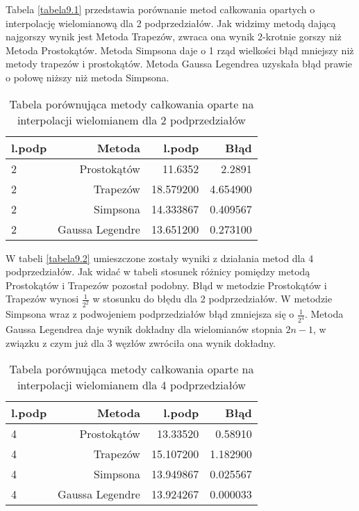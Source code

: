 \documentclass[12pt,twoside]{article}
\begin{document}
Tabela \eqref{tabela9.1} przedstawia porównanie metod całkowania opartych o interpolację wielomianową dla 2 podprzedziałów.
Jak widzimy metodą dającą najgorszy wynik jest Metoda Trapezów, zwraca ona wynik 2-krotnie gorszy niż Metoda Prostokątów. 
Metoda Simpsona daje o 1 rząd wielkości błąd mniejszy niż metody trapezów i prostokątów. 
Metoda Gaussa Legendrea uzyskała błąd prawie o połowę niższy niż metoda Simpsona.

\begin{table}
\centering 
\caption{Tabela porównująca metody całkowania oparte na interpolacji wielomianem dla 2 podprzedziałów }
\label{tabela9.1}
\begin{tabular}{lrrr}
\toprule
{l.podp} & Metoda &  l.podp &  Błąd \\
\midrule
2  &     Prostokątów & 11.6352 &   2.2891  \\
2  &     Trapezów & 18.579200 &  4.654900  \\
2  &     Simpsona & 14.333867 &   0.409567  \\
2  &     Gaussa Legendre & 13.651200 &  0.273100  \\
\bottomrule
\end{tabular}
\end{table}


W tabeli \eqref{tabela9.2} umieszczone zostały wyniki z działania metod dla 4 podprzedziałów.
Jak widać w tabeli stosunek różnicy pomiędzy metodą Prostokątów i Trapezów pozostał podobny.
Błąd w metodzie Prostokątów i Trapezów wynosi $\frac{1}{2^2}$ w stosunku do błędu dla 2 podprzedziałów.
W metodzie Simpsona wraz z podwojeniem podprzedziałów błąd zmniejsza się o $\frac{1}{2^4}$.
Metoda Gaussa Legendrea daje wynik dokładny dla wielomianów stopnia $2n-1$, w związku z czym już dla 3 węzłów zwróciła ona wynik dokładny.


\begin{table}
\centering 
\caption{Tabela porównująca metody całkowania oparte na interpolacji wielomianem dla 4 podprzedziałów }
\label{tabela9.2}
\begin{tabular}{lrrr}
\toprule
{l.podp} & Metoda &  l.podp &  Błąd \\
\midrule
4  &     Prostokątów & 13.33520 &   0.58910  \\
4  &     Trapezów & 15.107200 &  1.182900  \\
4  &     Simpsona & 13.949867 &   0.025567  \\
4  &     Gaussa Legendre & 13.924267 &  0.000033  \\
\bottomrule
\end{tabular}
\end{table}
\end{document}
